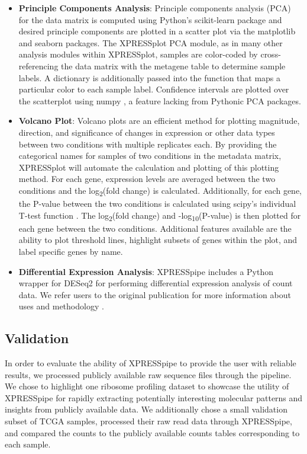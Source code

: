 \documentclass[11pt, a4paper, oneside]{article}
\begin{document}
\begin{itemize}
  \item \textbf{Principle Components Analysis}: Principle components analysis (PCA) for the data matrix is computed using Python's scikit-learn package \cite{scikit_learn} and desired principle components are plotted in a scatter plot via the matplotlib \cite{matplotlib} and seaborn \cite{seaborn} packages. The XPRESSplot PCA module, as in many other analysis modules within XPRESSplot, samples are color-coded by cross-referencing the data matrix with the metagene table to determine sample labels. A dictionary is additionally passed into the function that maps a particular color to each sample label. Confidence intervals are plotted over the scatterplot using numpy \cite{numpy1, numpy2}, a feature lacking from Pythonic PCA packages.

  \item \textbf{Volcano Plot}: Volcano plots are an efficient method for plotting magnitude, direction, and significance of changes in expression or other data types between two conditions with multiple replicates each. By providing the categorical names for samples of two conditions in the metadata matrix, XPRESSplot will automate the calculation and plotting of this plotting method. For each gene, expression levels are averaged between the two conditions and the log\textsubscript{2}(fold change) is calculated. Additionally, for each gene, the P-value between the two conditions is calculated using scipy's individual T-test function \cite{scipy}. The log\textsubscript{2}(fold change) and -log\textsubscript{10}(P-value) is then plotted for each gene between the two conditions. Additional features available are the ability to plot threshold lines, highlight subsets of genes within the plot, and label specific genes by name.

  \item \textbf{Differential Expression Analysis}: XPRESSpipe includes a Python wrapper for DESeq2 for performing differential expression analysis of count data. We refer users to the original publication for more information about uses and methodology \cite{deseq2}.

\end{itemize}

\subsection{Validation}
In order to evaluate the ability of XPRESSpipe to provide the user with reliable results, we processed publicly available raw sequence files through the pipeline. We chose to highlight one ribosome profiling dataset to showcase the utility of XPRESSpipe for rapidly extracting potentially interesting molecular patterns and insights from publicly available data. We additionally chose a small validation subset of TCGA samples, processed their raw read data through XPRESSpipe, and compared the counts to the publicly available counts tables corresponding to each sample.
\end{document}
